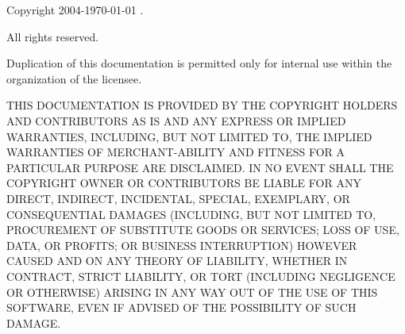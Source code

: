 
Copyright \textsuperscript{\textcopyright} 2004-{\theyear\today} \company.

All rights reserved.

Duplication of this documentation is permitted
only for internal use within the organization of the licensee.

THIS DOCUMENTATION IS PROVIDED BY THE COPYRIGHT
HOLDERS AND CONTRIBUTORS \textquotedbl{}AS IS\textquotedbl{} AND ANY
EXPRESS OR IMPLIED WARRANTIES, INCLUDING, BUT NOT LIMITED TO, THE
IMPLIED WARRANTIES OF MERCHANT-ABILITY AND FITNESS FOR A PARTICULAR
PURPOSE ARE DISCLAIMED. IN NO EVENT SHALL THE COPYRIGHT OWNER OR CONTRIBUTORS
BE LIABLE FOR ANY DIRECT, INDIRECT, INCIDENTAL, SPECIAL, EXEMPLARY,
OR CONSEQUENTIAL DAMAGES (INCLUDING, BUT NOT LIMITED TO, PROCUREMENT
OF SUBSTITUTE GOODS OR SERVICES; LOSS OF USE, DATA, OR PROFITS; OR
BUSINESS INTERRUPTION) HOWEVER CAUSED AND ON ANY THEORY OF LIABILITY,
WHETHER IN CONTRACT, STRICT LIABILITY, OR TORT (INCLUDING NEGLIGENCE
OR OTHERWISE) ARISING IN ANY WAY OUT OF THE USE OF THIS SOFTWARE,
EVEN IF ADVISED OF THE POSSIBILITY OF SUCH DAMAGE.



